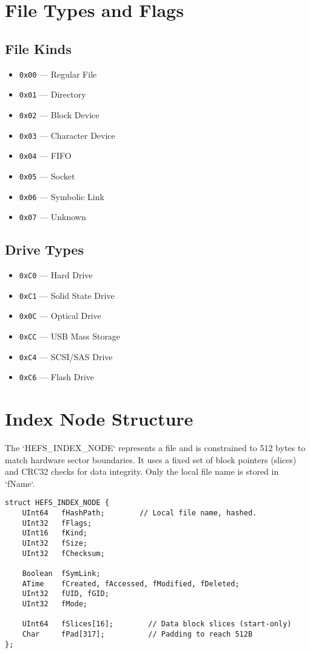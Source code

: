 \documentclass{article}
\begin{document}
\section{File Types and Flags}
\subsection*{File Kinds}
\begin{itemize}[label=--]
    \item \verb|0x00| --- Regular File
    \item \verb|0x01| --- Directory
    \item \verb|0x02| --- Block Device
    \item \verb|0x03| --- Character Device
    \item \verb|0x04| --- FIFO
    \item \verb|0x05| --- Socket
    \item \verb|0x06| --- Symbolic Link
    \item \verb|0x07| --- Unknown
\end{itemize}

\subsection*{Drive Types}
\begin{itemize}[label=--]
    \item \verb|0xC0| --- Hard Drive
    \item \verb|0xC1| --- Solid State Drive
    \item \verb|0x0C| --- Optical Drive
    \item \verb|0xCC| --- USB Mass Storage
    \item \verb|0xC4| --- SCSI/SAS Drive
    \item \verb|0xC6| --- Flash Drive
\end{itemize}

\section{Index Node Structure}
The `HEFS\_INDEX\_NODE` represents a file and is constrained to 512 bytes to match hardware sector boundaries. It uses a fixed set of block pointers (slices) and CRC32 checks for data integrity. Only the local file name is stored in `fName`.

\begin{lstlisting}[style=cstyle, caption={HEFS\_INDEX\_NODE (Fits 512B)}]
struct HEFS_INDEX_NODE {
    UInt64   fHashPath;        // Local file name, hashed.
    UInt32   fFlags;
    UInt16   fKind;
    UInt32   fSize;
    UInt32   fChecksum;

    Boolean  fSymLink;
    ATime    fCreated, fAccessed, fModified, fDeleted;
    UInt32   fUID, fGID;
    UInt32   fMode;

    UInt64   fSlices[16];        // Data block slices (start-only)
    Char     fPad[317];          // Padding to reach 512B
};
\end{lstlisting}
\end{document}

